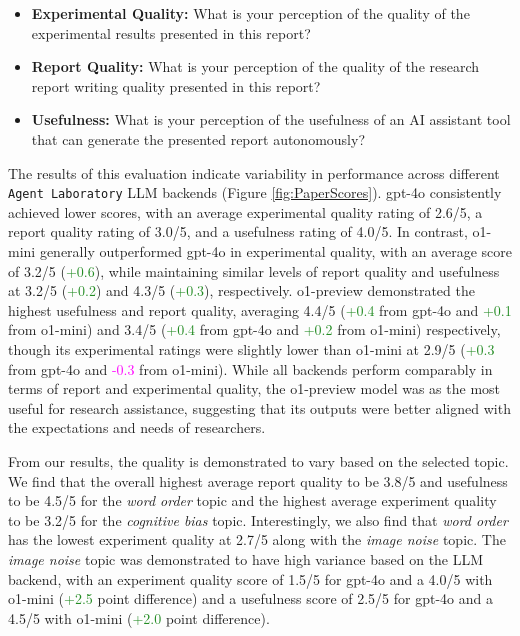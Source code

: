\documentclass[11pt, a4paper]{gdm_format}
\begin{document}
\begin{itemize}
    \item \textbf{Experimental Quality:} What is your perception of the quality of the experimental results presented in this report?
    \item \textbf{Report Quality:} What is your perception of the quality of the research report writing quality presented in this report?
    \item \textbf{Usefulness:} What is your perception of the usefulness of an AI assistant tool that can generate the presented report autonomously?
\end{itemize}



The results of this evaluation indicate variability in performance across different \texttt{Agent Laboratory} LLM backends (Figure \ref{fig:PaperScores}). gpt-4o consistently achieved lower scores, with an average experimental quality rating of 2.6/5, a report quality rating of 3.0/5, and a usefulness rating of 4.0/5. In contrast, o1-mini generally outperformed gpt-4o in experimental quality, with an average score of 3.2/5 (\textcolor{ForestGreen}{+0.6}), while maintaining similar levels of report quality and usefulness at 3.2/5 (\textcolor{ForestGreen}{+0.2}) and 4.3/5 (\textcolor{ForestGreen}{+0.3}), respectively. o1-preview demonstrated the highest usefulness and report quality, averaging 4.4/5 (\textcolor{ForestGreen}{+0.4} from gpt-4o and \textcolor{ForestGreen}{+0.1} from o1-mini) and 3.4/5 (\textcolor{ForestGreen}{+0.4} from gpt-4o and \textcolor{ForestGreen}{+0.2} from o1-mini) respectively, though its experimental ratings were slightly lower than o1-mini at 2.9/5 (\textcolor{ForestGreen}{+0.3} from gpt-4o and \textcolor{Magenta}{-0.3} from o1-mini). While all backends perform comparably in terms of report and experimental quality, the o1-preview model was as the most useful for research assistance, suggesting that its outputs were better aligned with the expectations and needs of researchers. 



From our results, the quality is demonstrated to vary based on the selected topic. We find that the overall highest average report quality to be 3.8/5 and usefulness to be 4.5/5 for the \textit{word order} topic and the highest average experiment quality to be 3.2/5 for the \textit{cognitive bias} topic. Interestingly, we also find that \textit{word order} has the lowest experiment quality at 2.7/5 along with the \textit{image noise} topic. The \textit{image noise} topic was demonstrated to have high variance based on the LLM backend, with an experiment quality score of 1.5/5 for gpt-4o and a 4.0/5 with o1-mini (\textcolor{ForestGreen}{+2.5} point difference) and a usefulness score of 2.5/5 for gpt-4o and a 4.5/5 with o1-mini (\textcolor{ForestGreen}{+2.0} point difference).
\end{document}
